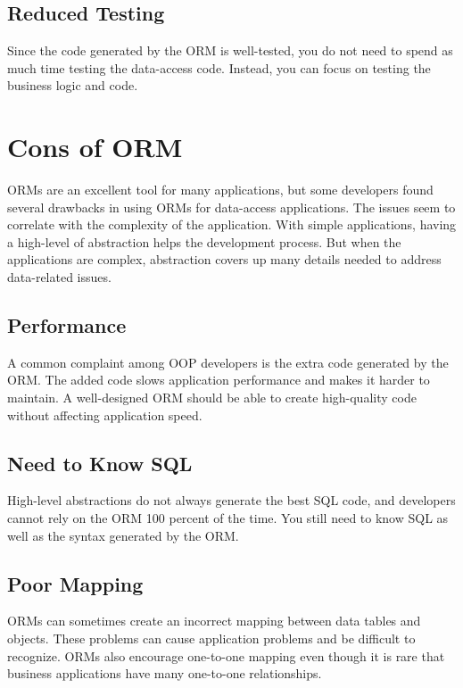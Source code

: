 \documentclass[10pt,a4paper,twoside]{article}
\begin{document}
\subsection{Reduced Testing}
\item Since the code generated by the ORM is well-tested, you do not need to spend as much time testing the data-access code. Instead, you can focus on testing the business logic and code.


\section{Cons of ORM}
\item ORMs are an excellent tool for many applications, but some developers found several drawbacks in using ORMs for data-access applications. The issues seem to correlate with the complexity of the application. With simple applications, having a high-level of abstraction helps the development process. But when the applications are complex, abstraction covers up many details needed to address data-related issues.
\subsection{Performance}
\item A common complaint among OOP developers is the extra code generated by the ORM. The added code slows application performance and makes it harder to maintain. A well-designed ORM should be able to create high-quality code without affecting application speed.
\subsection{Need to Know SQL}
\item High-level abstractions do not always generate the best SQL code, and developers cannot rely on the ORM 100 percent of the time. You still need to know SQL as well as the syntax generated by the ORM.
\subsection{Poor Mapping}
\item ORMs can sometimes create an incorrect mapping between data tables and objects. These problems can cause application problems and be difficult to recognize. ORMs also encourage one-to-one mapping even though it is rare that business applications have many one-to-one relationships.
\end{document}
